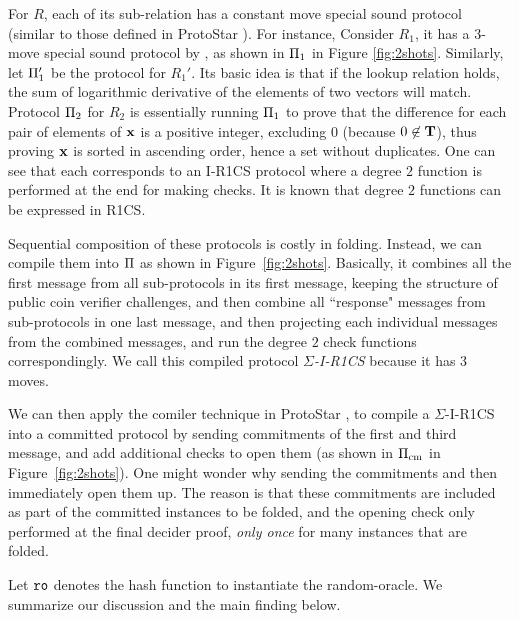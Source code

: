 \begin{example}
For $R$, each of its sub-relation has a constant move special
sound protocol (similar to those defined in ProtoStar \cite{ProtoStar}).
For instance, Consider $R_1$, it has a $3$-move special sound protocol
by \cite{Hab22}, as shown in ${\large{\Pi}}_1$ in Figure \ref{fig:2shots}. 
Similarly, let ${\large{\Pi}}_1'$ be the protocol for $R_1'$.
Its basic idea
is that if the lookup relation holds, the sum of logarithmic derivative
of the elements of two vectors will match. Protocol
${\large{\Pi}}_2$ for $R_2$ is essentially running ${\large{\Pi}}_1$ to prove
that the difference for each pair of elements of ${{\mathbf {x}}}$ is
a positive integer, excluding $0$ (because $0 \not\in {{\mathbf {T}}}$),
thus proving ${{\mathbf {x}}}$ is sorted in ascending order, hence
a set without duplicates. One can see that each corresponds to
an I-R1CS protocol where a degree $2$ function is performed
at the end for making checks. It is known that degree $2$ functions
can be expressed in R1CS.

Sequential composition of these protocols is costly in folding.
Instead, we can compile them into ${\large{\Pi}}$ as shown in Figure\ \ref{fig:2shots}.
Basically, it combines all the first message from all sub-protocols
in its first message, keeping the structure of public coin verifier
challenges, and then combine all ``response" messages from sub-protocols
in one last message, and then projecting each individual messages
from the combined messages, and run the degree $2$ check functions
correspondingly.  We call this compiled protocol {\em $\Sigma$-I-R1CS} 
because it has 3 moves.

We can then apply the comiler technique in ProtoStar
\cite[Section 3.2]{ProtoStar}, to compile a
$\Sigma$-I-R1CS into a committed protocol
by sending commitments of the first and
third message, and add additional checks to open them (as shown in
${\large{\Pi}}_{\textrm{cm}}$ in Figure\ \ref{fig:2shots}).
One might wonder why sending the commitments and then
immediately open them up. The reason is that these commitments
are included as part of the committed instances
to be folded, and the opening check only performed at the final decider proof,
{\em only once} for many instances that are folded.
\end{example}

Let $\texttt{ro}$  denotes the hash function to instantiate 
the random-oracle.
We summarize our discussion and the main finding below.


